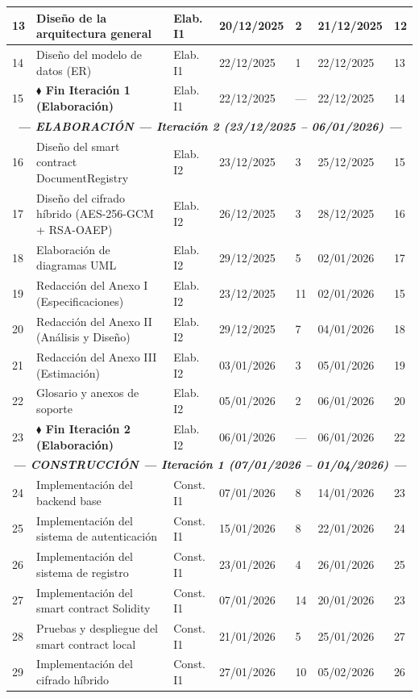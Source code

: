 \documentclass[11pt, a4paper]{article}
\begin{document}
\begin{longtable}{|p{0.6cm}|p{5.2cm}|p{2.5cm}|p{1.9cm}|p{0.9cm}|p{1.9cm}|p{1.4cm}|}
\hline
13 & Diseño de la arquitectura general & Elab. I1 & 20/12/2025 & 2 & 21/12/2025 & 12 \\
\hline
14 & Diseño del modelo de datos (ER) & Elab. I1 & 22/12/2025 & 1 & 22/12/2025 & 13 \\
\hline
15 & \textbf{$\blacklozenge$ Fin Iteración 1 (Elaboración)} & Elab. I1 & 22/12/2025 & --- & 22/12/2025 & 14 \\
\hline
\multicolumn{7}{|c|}{\textit{\textbf{--- ELABORACIÓN --- Iteración 2 (23/12/2025 -- 06/01/2026) ---}}} \\
\hline
16 & Diseño del smart contract DocumentRegistry & Elab. I2 & 23/12/2025 & 3 & 25/12/2025 & 15 \\
\hline
17 & Diseño del cifrado híbrido (AES-256-GCM + RSA-OAEP) & Elab. I2 & 26/12/2025 & 3 & 28/12/2025 & 16 \\
\hline
18 & Elaboración de diagramas UML & Elab. I2 & 29/12/2025 & 5 & 02/01/2026 & 17 \\
\hline
19 & Redacción del Anexo I (Especificaciones) & Elab. I2 & 23/12/2025 & 11 & 02/01/2026 & 15 \\
\hline
20 & Redacción del Anexo II (Análisis y Diseño) & Elab. I2 & 29/12/2025 & 7 & 04/01/2026 & 18 \\
\hline
21 & Redacción del Anexo III (Estimación) & Elab. I2 & 03/01/2026 & 3 & 05/01/2026 & 19 \\
\hline
22 & Glosario y anexos de soporte & Elab. I2 & 05/01/2026 & 2 & 06/01/2026 & 20 \\
\hline
23 & \textbf{$\blacklozenge$ Fin Iteración 2 (Elaboración)} & Elab. I2 & 06/01/2026 & --- & 06/01/2026 & 22 \\
\hline
\multicolumn{7}{|c|}{\textit{\textbf{--- CONSTRUCCIÓN --- Iteración 1 (07/01/2026 -- 01/04/2026) ---}}} \\
\hline
24 & Implementación del backend base & Const. I1 & 07/01/2026 & 8 & 14/01/2026 & 23 \\
\hline
25 & Implementación del sistema de autenticación & Const. I1 & 15/01/2026 & 8 & 22/01/2026 & 24 \\
\hline
26 & Implementación del sistema de registro & Const. I1 & 23/01/2026 & 4 & 26/01/2026 & 25 \\
\hline
27 & Implementación del smart contract Solidity & Const. I1 & 07/01/2026 & 14 & 20/01/2026 & 23 \\
\hline
28 & Pruebas y despliegue del smart contract local & Const. I1 & 21/01/2026 & 5 & 25/01/2026 & 27 \\
\hline
29 & Implementación del cifrado híbrido & Const. I1 & 27/01/2026 & 10 & 05/02/2026 & 26 \\

\end{longtable}
\end{document}
